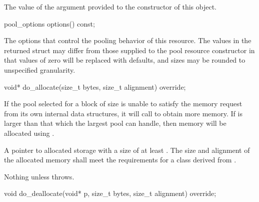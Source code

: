 \begin{itemdescr}
\pnum
\returns
The value of the  argument
provided to the constructor of this object.
\end{itemdescr}

%
%
\begin{itemdecl}
pool_options options() const;
\end{itemdecl}

\begin{itemdescr}
\pnum
\returns
The options that control the pooling behavior of this resource.
The values in the returned struct may differ
from those supplied to the pool resource constructor in that
values of zero will be replaced with 
defaults, and sizes may be rounded to unspecified granularity.
\end{itemdescr}

%
%
\begin{itemdecl}
void* do_allocate(size_t bytes, size_t alignment) override;
\end{itemdecl}

\begin{itemdescr}
\pnum
\effects
If the pool selected for a block of size 
is unable to satisfy the memory request from its own internal data structures,
it will call  to obtain more memory.
If  is larger than that which the largest pool can handle,
then memory will be allocated using .

\pnum
\returns
A pointer to allocated storage
with a size of at least .
The size and alignment of the allocated memory shall meet the requirements
for a class derived from .

\pnum
\throws
Nothing unless  throws.
\end{itemdescr}

%
%
\begin{itemdecl}
void do_deallocate(void* p, size_t bytes, size_t alignment) override;
\end{itemdecl}

